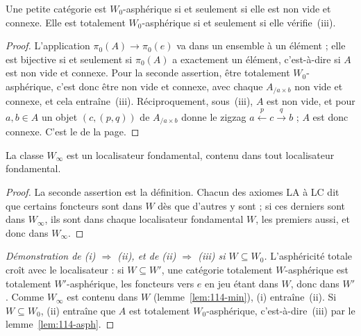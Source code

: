 \begin{lemme}\label{lem:114-asph}
Une petite catégorie est $W_0$-asphérique si et seulement si elle est non vide et connexe. Elle est totalement $W_0$-asphérique si et seulement si elle vérifie~(iii).
\end{lemme}

\begin{proof}
L'application $\pi_0(A) \to \pi_0(e)$ va dans un ensemble à un élément ; elle est bijective si et seulement si $\pi_0(A)$ a exactement un élément, c'est-à-dire si $A$ est non vide et connexe. Pour la seconde assertion, être totalement $W_0$-asphérique, c'est donc être non vide et connexe, avec chaque $A_{/a \times b}$ non vide et connexe, et cela entraîne~(iii). Réciproquement, sous~(iii), $A$ est non vide, et pour $a, b \in A$ un objet $(c, (p, q))$ de $A_{/a \times b}$ donne le zigzag $a \xleftarrow{p} c \xrightarrow{q} b$ ; $A$ est donc connexe. C'est le  de la page.
\end{proof}

\begin{lemme}\label{lem:114-min}
La classe $W_\infty$ est un localisateur fondamental, contenu dans tout localisateur fondamental.
\end{lemme}

\begin{proof}
La seconde assertion est la définition. Chacun des axiomes LA à LC dit que certains foncteurs sont dans $W$ dès que d'autres y sont ; si ces derniers sont dans $W_\infty$, ils sont dans chaque localisateur fondamental $W$, les premiers aussi, et donc dans $W_\infty$.
\end{proof}

\begin{proof}[Démonstration de (i) $\Rightarrow$ (ii), et de (ii) $\Rightarrow$ (iii) si $W \subseteq W_0$]
L'asphéricité totale croît avec le localisateur : si $W \subseteq W'$, une catégorie totalement $W$-asphérique est totalement $W'$-asphérique, les foncteurs vers $e$ en jeu étant dans $W$, donc dans $W'$. Comme $W_\infty$ est contenu dans $W$ (lemme~\ref{lem:114-min}), (i) entraîne~(ii). Si $W \subseteq W_0$, (ii) entraîne que $A$ est totalement $W_0$-asphérique, c'est-à-dire~(iii) par le lemme~\ref{lem:114-asph}.
\end{proof}


